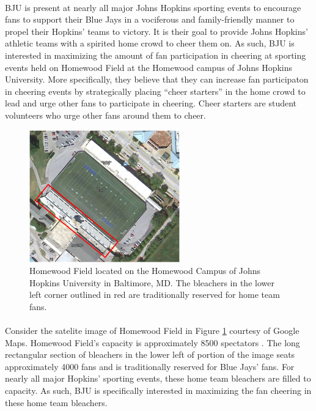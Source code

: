 \documentclass[oneside,12pt]{report}
\begin{document}
\paragraph{}
BJU is present at nearly all major Johns Hopkins sporting events to encourage fans to support their Blue Jays in a vociferous and family-friendly manner to propel their Hopkins' teams to victory. It is their goal to provide Johns Hopkins' athletic teams with a spirited home crowd to cheer them on. As such, BJU is interested in maximizing the amount of fan participation in cheering at sporting events held on Homewood Field at the Homewood campus of Johns Hopkins University. More specifically, they believe that they can increase fan participaton in cheering events by strategically placing ``cheer starters'' in the home crowd to lead and urge other fans to participate in cheering. Cheer starters are student volunteers who urge other fans around them to cheer.

\begin{figure}[h]
	\begin{center}
			\includegraphics[height=2.25in] {Bleachers.png}
	\end{center}
	\caption{Homewood Field located on the Homewood Campus of Johns Hopkins University in Baltimore, MD. The bleachers in the lower left corner outlined in red are traditionally reserved for home team fans.}
	\label{fig:homewoodfield}
\end{figure}

\paragraph{}
Consider the satelite image of Homewood Field in Figure \ref{fig:homewoodfield} courtesy of Google Maps. Homewood Field's capacity is approximately 8500 spectators \cite{wiki}. The long rectangular section of bleachers in the lower left of portion of the image seats approximately 4000 fans and is traditionally reserved for Blue Jays' fans. For nearly all major Hopkins' sporting events, these home team bleachers are filled to capacity. As such, BJU is specifically interested in maximizing the fan cheering in these home team bleachers. 
\end{document}
